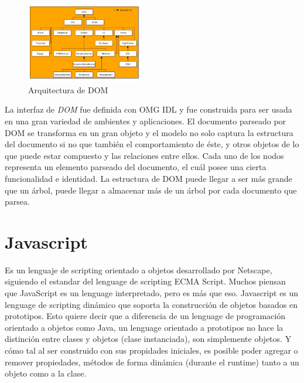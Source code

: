         \begin{figure}[h]
            \centering
            \includegraphics[width=0.45\textwidth]{figures/dom-architecture.jpg}
            \caption{Arquitectura de DOM \cite{w3c}}
            \label{fig:DOM}
        \end{figure}
        
         La interfaz de \textit{DOM} fue definida con OMG IDL y fue construida para ser usada en una gran variedad de ambientes y aplicaciones. El documento parseado por DOM se transforma en un gran objeto y el modelo no solo captura la estructura del documento si no que también el comportamiento de éste, y otros objetos de lo que puede estar compuesto y las relaciones entre ellos. Cada uno de los nodos representa un elemento parseado del documento, el cuál  posee una cierta funcionalidad e identidad. La estructura de DOM puede llegar a ser más grande que un árbol, puede llegar a almacenar más de un árbol por cada documento que parsea. %
        
\section{Javascript}
        Es un lenguaje de scripting orientado a objetos desarrollado por Netscape, siguiendo el estandar del lenguage de scripting ECMA Script. Muchos piensan que JavaScript es un lenguage interpretado, pero es más que eso. Javascript es un lenguage de scripting dinámico que soporta la construcción de objetos basados en prototipos. Esto quiere decir que a diferencia de un lenguage de programación orientado a objetos como Java, un lenguage orientado a prototipos no hace la distinción entre clases y objetos (clase instanciada), son simplemente objetos. Y cómo tal al ser construido con sus propidades iniciales, es posible poder agregar o remover propiedades, métodos de forma dinámica (durante el runtime) tanto a un objeto como a la clase.
        
